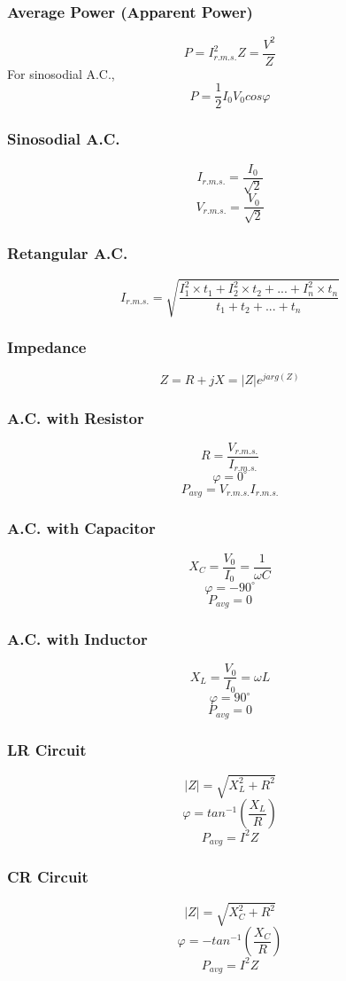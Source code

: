 \documentclass{article}
\begin{document}
\subsubsection*{Average Power (Apparent Power)}
\[P=I_{r.m.s.}^2Z=\frac{V^2}{Z}\]
For sinosodial A.C.,
\[P=\frac{1}{2}I_0V_0cos\varphi\]

\subsubsection*{Sinosodial A.C.}
\[I_{r.m.s.}=\frac{I_0}{\sqrt{2}}\]
\[V_{r.m.s.}=\frac{V_0}{\sqrt{2}}\]

\subsubsection*{Retangular A.C.}
\[I_{r.m.s.}=\sqrt{\frac{I_1^2\times t_1+I_2^2\times t_2+...+I_n^2\times t_n}{t_1+t_2+...+t_n}}\]

\subsubsection*{Impedance}
\[Z=R+jX=|Z|e^{jarg(Z)}\]

\subsubsection*{A.C. with Resistor}
\[R=\frac{V_{r.m.s.}}{I_{r.m.s.}}\]
\[\varphi=0^{\circ}\]
\[P_{avg}=V_{r.m.s.}I_{r.m.s.}\]

\subsubsection*{A.C. with Capacitor}
\[X_C=\frac{V_0}{I_0}=\frac{1}{\omega C}\]
\[\varphi=-90^{\circ}\]
\[P_{avg}=0\]

\subsubsection*{A.C. with Inductor}
\[X_L=\frac{V_0}{I_0}=\omega L\]
\[\varphi=90^{\circ}\]
\[P_{avg}=0\]

\subsubsection*{LR Circuit}
\[|Z|=\sqrt{X_L^2+R^2}\]
\[\varphi=tan^{-1}(\frac{X_L}{R})\]
\[P_{avg}=I^2Z\]

\subsubsection*{CR Circuit}
\[|Z|=\sqrt{X_C^2+R^2}\]
\[\varphi=-tan^{-1}(\frac{X_C}{R})\]
\[P_{avg}=I^2Z\]
\end{document}
